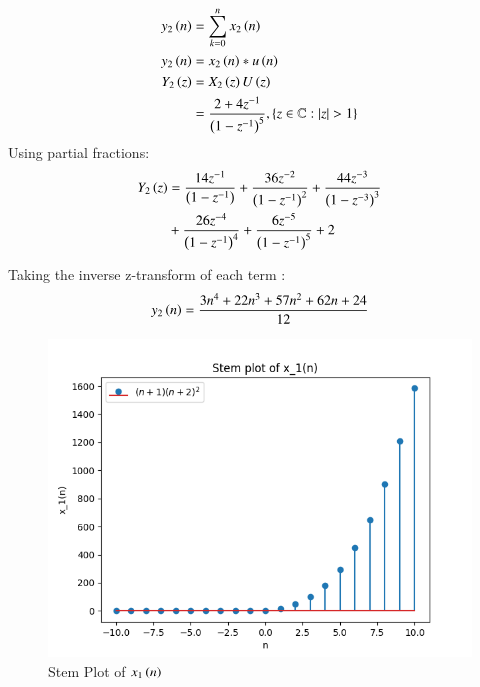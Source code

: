 \documentclass[journal,12pt,twocolumn]{IEEEtran}
\theoremstyle{remark}
\begin{document}
\begin{enumerate}[label=\arabic*.]
\begin{align}
    y_2\left(n\right) &= \sum_{k=0}^n x_2\left(n\right)\\
    y_2\left(n\right) &= x_2\left(n\right)\ast u\left(n\right)\\
    Y_2\left(z\right) &= X_2\left(z\right) U\left(z\right) \\
 &=\frac{2+4z^{-1}}{\left(1-z^{-1}\right)^5} ,\left\{z\in\mathbb{C} : \lvert z \rvert > 1\right\} 
\end{align}
Using partial fractions:
\begin{align}
    Y_2\left(z\right) &= \frac{14z^{-1}}{\left(1-z^{-1}\right)} + \frac{36z^{-2}}{\left(1-z^{-1}\right)^2} + \frac{44z^{-3}}{\left(1-z^{-3}\right)^3} \\&+ \frac{26z^{-4}}{\left(1-z^{-1}\right)^4}+\frac{6z^{-5}}{\left(1-z^{-1}\right)^5}+2\notag 
\end{align}

Taking the inverse z-transform of each term :
\begin{align}
    y_2\left(n\right) =  \frac{3n^4 + 22n^3 + 57n^2 + 62n + 24}{12}
\end{align}
\end{enumerate}

\begin{figure}[htbp]
    \centering
    \includegraphics[width=1\columnwidth]{x1_plot.png}
    \caption{Stem Plot of $x_1\left(n\right)$}
    \label{fig:x1}
\end{figure}
\end{document}
